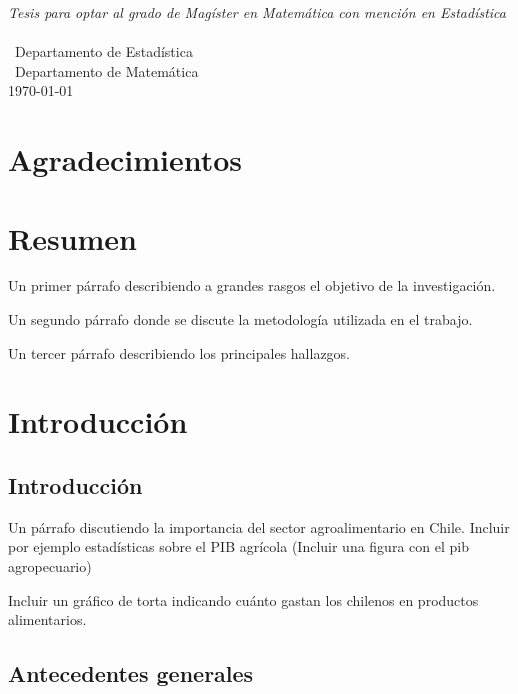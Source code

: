 \documentclass[12pt, twoside]{book}\usepackage[]{graphicx}\usepackage[]{color}
\numberwithin{equation}{section}
\numberwithin{theorem}{section}
\numberwithin{teorema}{section}
\numberwithin{defi}{section}
\numberwithin{prop}{section}
\numberwithin{defi}{section}
\theoremstyle{plain}
\begin{document}
\begin{titlepage}
\begin{center}
\large \textit{Tesis para optar al grado de Magíster en Matemática con mención en Estadística}\\[0.3cm] %
\textit{}\\[0.4cm]
\ Departamento de Estadística \\
[0.4cm]\ Departamento de Matemática
\\[1cm] %
 
{\large \today}\\[2cm] %
 
\end{center}

\end{titlepage}
\newpage



\tableofcontents

\listoffigures
\listoftables
\onehalfspacing
\chapter*{Agradecimientos}
\chapter*{Resumen}

Un primer párrafo describiendo a grandes rasgos el objetivo de la investigación. 

Un segundo párrafo donde se discute la metodología utilizada en el trabajo. 

Un tercer párrafo describiendo los principales hallazgos. 
\chapter{Introducción}

\section{Introducción}

Un párrafo discutiendo la importancia del sector agroalimentario en Chile. Incluir por ejemplo estadísticas sobre el PIB agrícola (Incluir una figura con el pib agropecuario)

Incluir un gráfico de torta indicando cuánto gastan los chilenos en productos alimentarios. 

\section{Antecedentes generales}
\end{document}
